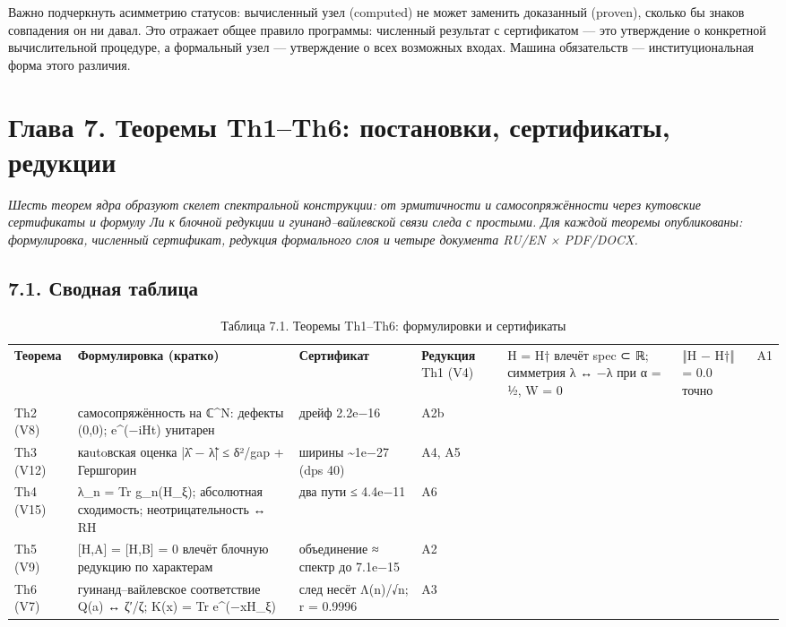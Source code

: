 \documentclass[11pt,a4paper]{article}
\begin{document}
Важно подчеркнуть асимметрию статусов: вычисленный узел (computed) не может заменить доказанный (proven), сколько бы знаков совпадения он ни давал. Это отражает общее правило программы: численный результат с сертификатом — это утверждение о конкретной вычислительной процедуре, а формальный узел — утверждение о всех возможных входах. Машина обязательств — институциональная форма этого различия.

\section{Глава 7. Теоремы Th1–Th6: постановки, сертификаты, редукции}

\noindent\textit{\color{copper}Шесть теорем ядра образуют скелет спектральной конструкции: от эрмитичности и самосопряжённости через кутовские сертификаты и формулу Ли к блочной редукции и гуинанд–вайлевской связи следа с простыми. Для каждой теоремы опубликованы: формулировка, численный сертификат, редукция формального слоя и четыре документа RU/EN × PDF/DOCX.}

\subsection{7.1. Сводная таблица}

\begin{table}[htbp]\centering\small
\caption{Таблица 7.1. Теоремы Th1–Th6: формулировки и сертификаты}
\begin{tabular}{p{} p{} p{} p{}}
\toprule
\textbf{Теорема} & \textbf{Формулировка (кратко)} & \textbf{Сертификат} & \textbf{Редукция}
\midrule
Th1 (V4) & H = H† влечёт spec ⊂ ℝ; симметрия λ ↔ −λ при α = ½, W = 0 & ‖H − H†‖ = 0.0 точно & A1 \\
Th2 (V8) & самосопряжённость на ℂ\textasciicircum{}N: дефекты (0,0); e\textasciicircum{}(−iHt) унитарен & дрейф 2.2e−16 & A2b \\
Th3 (V12) & каutoвская оценка |λ̂ − λ̃| ≤ δ²/gap + Гершгорин & ширины \textasciitilde{}1e−27 (dps 40) & A4, A5 \\
Th4 (V15) & λ\_n = Tr g\_n(H\_ξ); абсолютная сходимость; неотрицательность ↔ RH & два пути ≤ 4.4e−11 & A6 \\
Th5 (V9) & [H,A] = [H,B] = 0 влечёт блочную редукцию по характерам & объединение ≈ спектр до 7.1e−15 & A2 \\
Th6 (V7) & гуинанд–вайлевское соответствие Q(a) ↔ ζ′/ζ; K(x) = Tr e\textasciicircum{}(−xH\_ξ) & след несёт Λ(n)/√n; r = 0.9996 & A3 \\
\bottomrule
\end{tabular}
\end{table}
\end{document}
